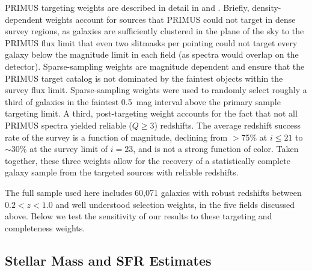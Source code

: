 PRIMUS targeting weights are described in detail in \citet{Coil11} and \citet{Cool13}.
Briefly, density-dependent weights account for sources that PRIMUS could not target in dense survey regions, as galaxies are sufficiently clustered in the 
plane of
the sky to the PRIMUS flux limit that even two slitmasks per pointing could not target every galaxy below the magnitude limit in each field (as spectra would overlap on the detector). 
Sparse-sampling weights are magnitude dependent and ensure that the PRIMUS target catalog is not dominated by the faintest objects within the survey flux limit. Sparse-sampling weights were used to randomly select roughly a third 
of galaxies in the faintest 0.5~mag interval above the primary sample 
targeting limit.
A third, post-targeting weight \citep[detailed in][]{Cool13} accounts for the fact that not all PRIMUS spectra yielded reliable {($Q \ge 3$)} redshifts.
The average redshift success rate of the survey is a function of magnitude, declining from $>$75\% at ${i\le21}$ to $\sim$30\% at the survey limit of $i=23$, and is not a strong function of color.  
Taken together, these three weights allow for the recovery of a statistically complete galaxy sample from the targeted sources with reliable redshifts.  

The full sample used here includes 60,071 galaxies with robust redshifts between $0.2<z<1.0$ and well understood selection weights, in the five fields discussed above.
Below we test the sensitivity of our results to these targeting and completeness weights.

\subsection{Stellar Mass and SFR Estimates}\label{sec:SFR}
 
